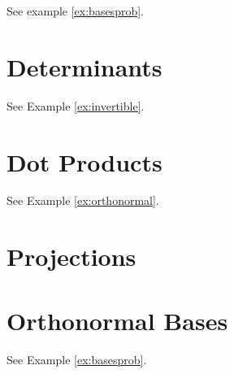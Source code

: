 \documentclass{ximera}
\begin{document}
See example \ref{ex:basesprob}.

\section*{Determinants}

See Example \ref{ex:invertible}.

\section*{Dot Products}

See Example \ref{ex:orthonormal}.

\section*{Projections}

\section*{Orthonormal Bases}

See Example \ref{ex:basesprob}.
\end{document}
